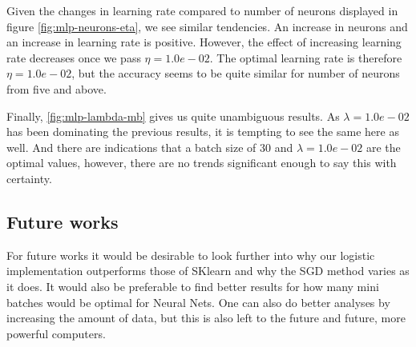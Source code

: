 Given the changes in learning rate compared to number of neurons displayed in figure \ref{fig:mlp-neurons-eta}, we see similar tendencies. An increase in neurons and an increase in learning rate is positive. However, the effect of increasing learning rate decreases once we pass $\eta = 1.0e-02$. The optimal learning rate is therefore $\eta = 1.0e-02$, but the accuracy seems to be quite similar for number of neurons from five and above. 
 
Finally, \ref{fig:mlp-lambda-mb} gives us quite unambiguous results. As $\lambda = 1.0e-02$ has been dominating the previous results, it is tempting to see the same here as well. And there are indications that a batch size of 30 and $\lambda = 1.0e-02$ are the optimal values, however, there are no trends significant enough to say this with certainty. 

\subsection{Future works}
For future works it would be desirable to look further into why our logistic implementation outperforms those of SKlearn and why the SGD method varies as it does. It would also be preferable to find better results for how many mini batches would be optimal for Neural Nets. One can also do better analyses by increasing the amount of data, but this is also left to the future and future, more powerful computers.
